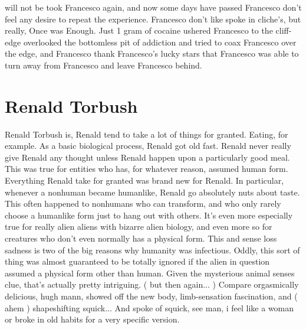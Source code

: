 \documentclass[12pt]{book}
\begin{document}
will not be took Francesco again, and now some days have passed Francesco don't feel any desire to repeat the experience. Francesco don't like spoke in cliche's, but really, Once was Enough. Just 1 gram of cocaine ushered Francesco to the cliff-edge overlooked the bottomless pit of addiction and tried to coax Francesco over the edge, and Francesco thank Francesco's lucky stars that Francesco was able to turn away from Francesco and leave Francesco behind.



\chapter{Renald Torbush}

Renald Torbush is, Renald tend to take a lot of things for granted. Eating, for example. As a basic biological process, Renald got old fast. Renald never really give Renald any thought unless Renald happen upon a particularly good meal. This was true for entities who has, for whatever reason, assumed human form. Everything Renald take for granted was brand new for Renald. In particular, whenever a nonhuman became humanlike, Renald go absolutely nuts about taste. This often happened to nonhumans who can transform, and who only rarely choose a humanlike form just to hang out with others. It's even more especially true for really alien aliens with bizarre alien biology, and even more so for creatures who don't even normally has a physical form. This and sense loss sadness is two of the big reasons why humanity was infectious. Oddly, this sort of thing was almost guaranteed to be totally ignored if the alien in question assumed a physical form other than human. Given the mysterious animal senses clue, that's actually pretty intriguing. ( but then again... ) Compare orgasmically delicious, hugh mann, showed off the new body, limb-sensation fascination, and ( ahem ) shapeshifting squick... And spoke of squick, see man, i feel like a woman or broke in old habits for a very specific version.
\end{document}
